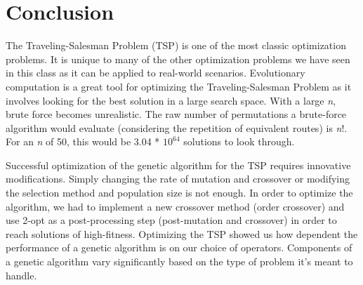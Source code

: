 \documentclass{article}
\begin{document}
\section*{Conclusion}
The Traveling-Salesman Problem (TSP) is one of the most classic optimization problems. It is unique to many of the other optimization problems we have seen in this class as it can be applied to real-world scenarios. Evolutionary computation is a great tool for optimizing the Traveling-Salesman Problem as it involves looking for the best solution in a large search space. With a large \textit{n}, brute force becomes unrealistic. The raw number of permutations a brute-force algorithm would evaluate (considering the repetition of equivalent routes) is \textit{n}!. For an \textit{n} of 50, this would be 3.04 * $10^{64}$ solutions to look through. 

Successful optimization of the genetic algorithm for the TSP requires innovative modifications. Simply changing the rate of mutation and crossover or modifying the selection method and population size is not enough. In order to optimize the algorithm, we had to implement a new crossover method (order crossover) and use 2-opt as a post-processing step (post-mutation and crossover) in order to reach solutions of high-fitness. Optimizing the TSP showed us how dependent the performance of a genetic algorithm is on our choice of operators. Components of a genetic algorithm vary significantly based on the type of problem it's meant to handle.
\end{document}

